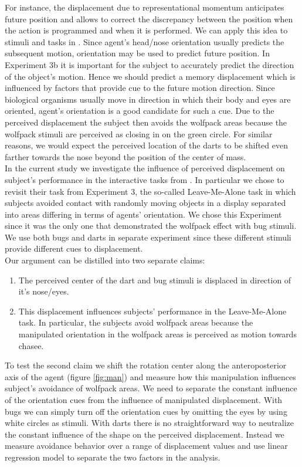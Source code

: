 \documentclass[10pt]{article}
\begin{document}
For instance, the displacement due to representational momentum anticipates future position and allows to correct the discrepancy between the position when the action is programmed and when it is performed. 
We can apply this idea to stimuli and tasks in \cite{gao10}. Since agent's head/nose orientation usually predicts the subsequent motion, orientation may be used to predict future position. 
In Experiment 3b it is important for the subject to accurately predict the direction of the object's motion. 
Hence we should predict a memory displacement which is influenced by factors that provide cue to the future motion direction. 
Since biological organisms usually move in direction in which their body and eyes are oriented, agent's orientation is a good candidate for such a cue.  
Due to the perceived displacement the subject then avoids the wolfpack areas because the wolfpack stimuli are perceived as closing in on the green circle. 
For similar reasons, we would expect the perceived location of the darts to be shifted even farther towards the nose beyond the position of the center of mass.\\
In the current study we investigate the influence of perceived displacement on subject's performance in the interactive tasks from \cite{gao10}. 
In particular we chose to revisit their task from Experiment 3, the so-called Leave-Me-Alone task in which subjects avoided contact with randomly moving objects in a display separated into areas differing in terms of agents' orientation. 
We chose this Experiment since it was the only one that demonstrated the wolfpack effect with bug stimuli. We use both bugs and darts in separate experiment since these different stimuli provide different cues to displacement.\\
Our argument can be distilled into two separate claims:
\begin{enumerate}
  \item The perceived center of the dart and bug stimuli is displaced in direction of it's nose/eyes.
  \item This displacement influences subjects' performance in the Leave-Me-Alone task. 
In particular, the subjects avoid wolfpack areas because the manipulated orientation in the wolfpack areas is perceived as motion towards chasee.
\end{enumerate}  
To test the second claim we shift the rotation center along the anteroposterior axis of the agent (figure \ref{fig:man}) and measure how this manipulation influences subject's avoidance of wolfpack areas. We need to separate the constant influence of the orientation cues from the influence of manipulated displacement. With bugs we can simply turn off the orientation cues by omitting the eyes by using white circles as stimuli. With darts there is no straightforward way to neutralize the constant influence of the shape on the perceived displacement. Instead we measure avoidance behavior over a range of displacement values and use linear regression model to separate the two factors in the analysis.\\
\end{document}
